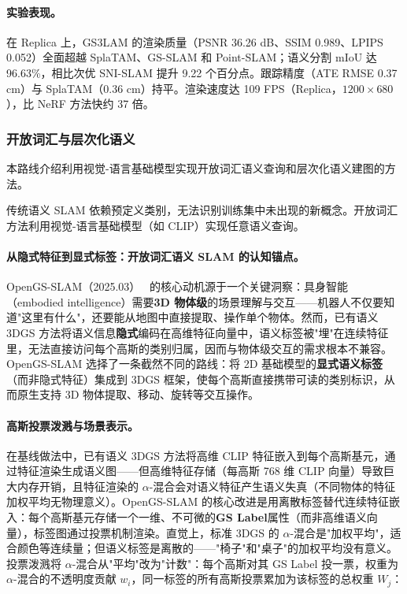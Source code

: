\paragraph{实验表现。}
在 Replica 上，GS3LAM 的渲染质量（PSNR 36.26 dB、SSIM 0.989、LPIPS 0.052）全面超越 SplaTAM、GS-SLAM 和 Point-SLAM；语义分割 mIoU 达 96.63\%，相比次优 SNI-SLAM 提升 9.22 个百分点。跟踪精度（ATE RMSE 0.37 cm）与 SplaTAM（0.36 cm）持平。渲染速度达 109 FPS（Replica，$1200 \times 680$），比 NeRF 方法快约 37 倍。

\subsubsection{开放词汇与层次化语义}

本路线介绍利用视觉-语言基础模型实现开放词汇语义查询和层次化语义建图的方法。

传统语义 SLAM 依赖预定义类别，无法识别训练集中未出现的新概念。开放词汇方法利用视觉-语言基础模型（如 CLIP）实现任意语义查询。

\paragraph{从隐式特征到显式标签：开放词汇语义 SLAM 的认知锚点。}
OpenGS-SLAM（2025.03）~\cite{2503_01646} 的核心动机源于一个关键洞察：具身智能（embodied intelligence）需要\textbf{3D 物体级}的场景理解与交互——机器人不仅要知道"这里有什么"，还要能从地图中直接提取、操作单个物体。然而，已有语义 3DGS 方法将语义信息\textbf{隐式}编码在高维特征向量中，语义标签被"埋"在连续特征里，无法直接访问每个高斯的类别归属，因而与物体级交互的需求根本不兼容。OpenGS-SLAM 选择了一条截然不同的路线：将 2D 基础模型的\textbf{显式语义标签}（而非隐式特征）集成到 3DGS 框架，使每个高斯直接携带可读的类别标识，从而原生支持 3D 物体提取、移动、旋转等交互操作。

\paragraph{高斯投票泼溅与场景表示。}
在基线做法中，已有语义 3DGS 方法将高维 CLIP 特征嵌入到每个高斯基元，通过特征渲染生成语义图——但高维特征存储（每高斯 768 维 CLIP 向量）导致巨大内存开销，且特征渲染的 $\alpha$-混合会对语义特征产生语义失真（不同物体的特征加权平均无物理意义）。OpenGS-SLAM 的核心改进是用离散标签替代连续特征嵌入：每个高斯基元存储一个一维、不可微的\textbf{GS Label}属性（而非高维语义向量），标签图通过投票机制渲染。直觉上，标准 3DGS 的 $\alpha$-混合是"加权平均"，适合颜色等连续量；但语义标签是离散的——"椅子"和"桌子"的加权平均没有意义。投票泼溅将 $\alpha$-混合从"平均"改为"计数"：每个高斯对其 GS Label 投一票，权重为 $\alpha$-混合的不透明度贡献 $w_i$，同一标签的所有高斯投票累加为该标签的总权重 $W_j$：

